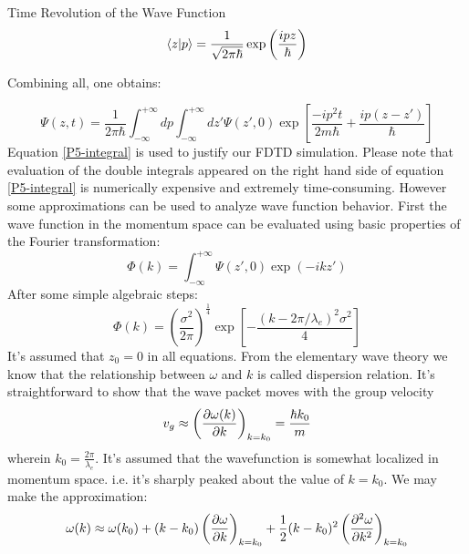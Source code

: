 \begin{homeworkProblem}
\begin{homeworkSection}{Time Revolution of the Wave Function}
\begin{equation}
\langle z|p\rangle=\frac{1}{\sqrt{2\pi\hbar}}\exp\left(\frac{ipz}{\hbar}\right)
\end{equation}

Combining all, one obtains:

\begin{equation}\label{P5-integral}
\Psi(z,t)=\frac{1}{2\pi\hbar}\int_{-\infty}^{+\infty}dp\int_{-\infty}^{+\infty}dz'\Psi(z',0)\exp\left[\frac{-ip^2t}{2m\hbar}+\frac{ip(z-z')}{\hbar}\right]
\end{equation}
Equation \eqref{P5-integral} is used to justify our FDTD simulation. Please note that evaluation of the double integrals appeared on the right hand side of equation \eqref{P5-integral} is numerically expensive and extremely time-consuming. However some approximations can be used to analyze wave function behavior. First the wave function in the momentum space can be evaluated using basic properties of the Fourier transformation:
\begin{equation}
\Phi(k)=\int_{-\infty}^{+\infty}\Psi(z',0)\exp\left(-ikz'\right)
\end{equation}
After some simple algebraic steps:
\begin{equation}
\Phi(k)=\left(\frac{\sigma^2}{2\pi}\right)^{\frac{1}{4}}\exp\left[-\frac{(k-2\pi/\lambda_e)^2\sigma^2}{4}\right]
\end{equation}
It's assumed that $z_0=0$ in all equations. From the elementary  wave theory we know that the relationship between $\omega$ and $k$ is called dispersion relation. It's straightforward to show that the wave packet moves with the group velocity
\begin{equation}
v_g\approx\left(\dfrac{\partial \omega(k)}{\partial k}\right)_{k=k_0}=\frac{\hbar k_0}{m}
\end{equation} 
wherein $k_0=\frac{2\pi}{\lambda_e}$. It's assumed that the wavefunction is somewhat localized in momentum space. i.e. it's sharply peaked about the value of $k=k_0$. We may make the approximation:
\begin{equation}\label{P5-dis}
\omega(k)\approx \omega(k_0)+(k-k_0)\left(\dfrac{\partial \omega}{\partial k}\right)_{k=k_0}+\frac{1}{2}(k-k_0)^2\left(\dfrac{\partial^2 {\omega}}{\partial {k}^2}\right)_{k=k_0}
\end{equation}  


\end{homeworkSection}
\end{homeworkProblem}
